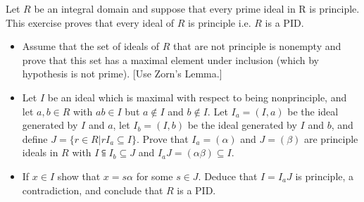 \documentclass[10pt]{article}
\newenvironment{problem}[2][Problem]{\begin{trivlist}
		\item[\hskip \labelsep {\bfseries #1}\hskip \labelsep {\bfseries #2.}]}{\end{trivlist}}
\begin{document}
	\begin{problem}{2.6}
		Let $R$ be an integral domain and suppose that every prime ideal in R is principle. This exercise proves that every ideal of $R$ is principle i.e. $R$ is a PID.
		\begin{itemize}
			\item[(a)] Assume that the set of ideals of $R$ that are not principle is nonempty and prove that this set has a maximal element under inclusion (which by hypothesis is not prime). [Use Zorn's Lemma.]
			\item[(b)] Let $I$ be an ideal which is maximal with respect to being nonprinciple, and let $a,b \in R$ with $ab \in I$ but $a \notin I$ and $b \notin I$. Let $I_{a} = (I, a)$ be the ideal generated by $I$ and $a$, let $I_{b}=(I, b)$ be the ideal generated by $I$ and $b$, and define $J=\{ r \in R | r I_{a} \subseteq I\}$. Prove that $I_{a}=(\alpha)$ and $J=(\beta)$ are principle ideals in $R$ with $I \subseteqq I_{b} \subseteq J$ and $I_{a}J = (\alpha \beta) \subseteq I$.
			\item[(c)] If $x \in I$ show that $x=s\alpha$ for some $s \in J$. Deduce that $I = I_{a}J$ is principle, a contradiction, and conclude that $R$ is a PID.
		\end{itemize}
		

\end{problem}
\end{document}
